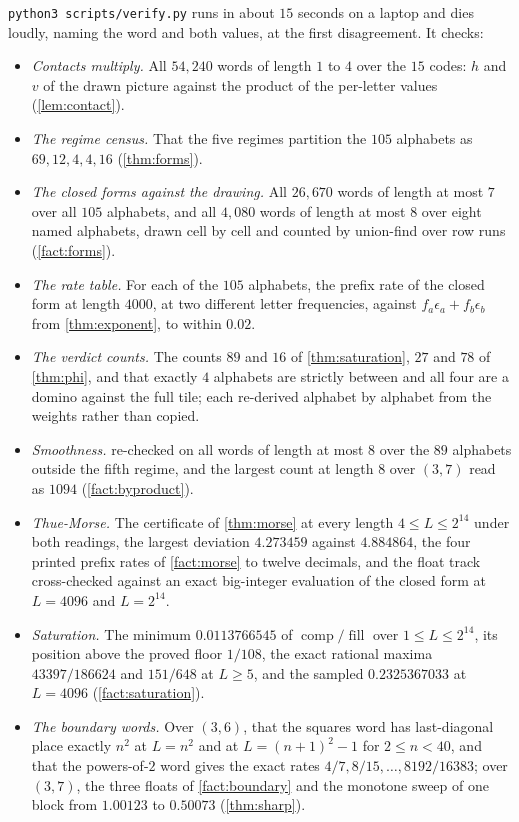 \documentclass[11pt]{amsart}
\theoremstyle{definition}
\theoremstyle{remark}
\DeclareMathOperator{\comp}{comp}
\DeclareMathOperator{\fil}{fill}
\begin{document}
\texttt{python3 scripts/verify.py} runs in about $15$ seconds on a laptop and dies loudly, naming the word and both values, at the first disagreement. It checks:

\begin{itemize}
\item \emph{Contacts multiply.} All $54{,}240$ words of length $1$ to $4$ over the $15$ codes: $h$ and $v$ of the drawn picture against the product of the per-letter values (\cref{lem:contact}).
\item \emph{The regime census.} That the five regimes partition the $105$ alphabets as $69, 12, 4, 4, 16$ (\cref{thm:forms}).
\item \emph{The closed forms against the drawing.} All $26{,}670$ words of length at most $7$ over all $105$ alphabets, and all $4{,}080$ words of length at most $8$ over eight named alphabets, drawn cell by cell and counted by union-find over row runs (\cref{fact:forms}).
\item \emph{The rate table.} For each of the $105$ alphabets, the prefix rate of the closed form at length $4000$, at two different letter frequencies, against $f_a\epsilon_a + f_b\epsilon_b$ from \cref{thm:exponent}, to within $0.02$.
\item \emph{The verdict counts.} The counts $89$ and $16$ of \cref{thm:saturation}, $27$ and $78$ of \cref{thm:phi}, and that exactly $4$ alphabets are strictly between and all four are a domino against the full tile; each re-derived alphabet by alphabet from the weights rather than copied.
\item \emph{Smoothness.}  re-checked on all words of length at most $8$ over the $89$ alphabets outside the fifth regime, and the largest count at length $8$ over $(3,7)$ read as $1094$ (\cref{fact:byproduct}).
\item \emph{Thue-Morse.} The certificate of \cref{thm:morse} at every length $4 \le L \le 2^{14}$ under both readings, the largest deviation $4.273459$ against $4.884864$, the four printed prefix rates of \cref{fact:morse} to twelve decimals, and the float track cross-checked against an exact big-integer evaluation of the closed form at $L = 4096$ and $L = 2^{14}$.
\item \emph{Saturation.} The minimum $0.0113766545$ of $\comp/\fil$ over $1 \le L \le 2^{14}$, its position above the proved floor $1/108$, the exact rational maxima $43397/186624$ and $151/648$ at $L \ge 5$, and the sampled $0.2325367033$ at $L = 4096$ (\cref{fact:saturation}).
\item \emph{The boundary words.} Over $(3,6)$, that the squares word has last-diagonal place exactly $n^2$ at $L = n^2$ and at $L = (n+1)^2-1$ for $2 \le n < 40$, and that the powers-of-$2$ word gives the exact rates $4/7, 8/15, \dots, 8192/16383$; over $(3,7)$, the three floats of \cref{fact:boundary} and the monotone sweep of one block from $1.00123$ to $0.50073$ (\cref{thm:sharp}).

\end{itemize}
\end{document}
